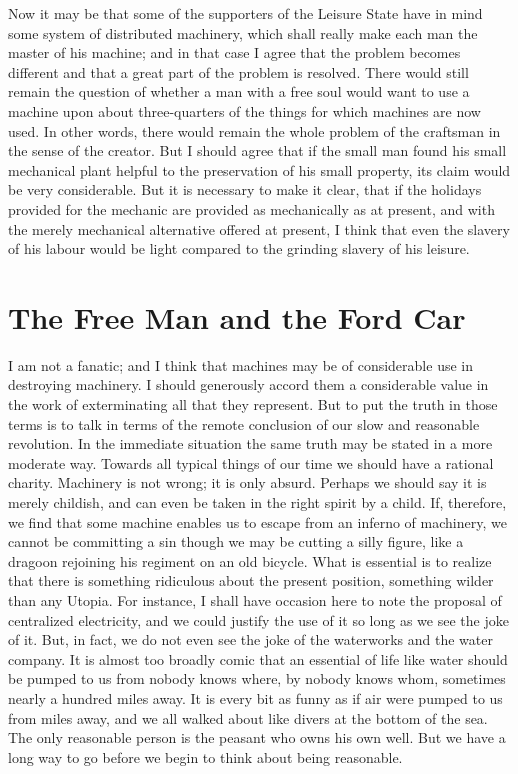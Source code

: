 \documentclass{book}
\begin{document}
Now it may be that some of the supporters of the Leisure State have in mind some system of distributed machinery, which shall really make each man the master of his machine; and in that case I agree that the problem becomes different and that a great part of the problem is resolved. There would still remain the question of whether a man with a free soul would want to use a machine upon about three-quarters of the things for which machines are now used. In other words, there would remain the whole problem of the craftsman in the sense of the creator. But I should agree that if the small man found his small mechanical plant helpful to the preservation of his small property, its claim would be very considerable. But it is necessary to make it clear, that if the holidays provided for the mechanic are provided as mechanically as at present, and with the merely mechanical alternative offered at present, I think that even the slavery of his labour would be light compared to the grinding slavery of his leisure.

\chapter{The Free Man and the Ford Car}
\label{chapter-18}
I am not a fanatic; and I think that machines may be of considerable use in destroying machinery. I should generously accord them a considerable value in the work of exterminating all that they represent. But to put the truth in those terms is to talk in terms of the remote conclusion of our slow and reasonable revolution. In the immediate situation the same truth may be stated in a more moderate way. Towards all typical things of our time we should have a rational charity. Machinery is not wrong; it is only absurd. Perhaps we should say it is merely childish, and can even be taken in the right spirit by a child. If, therefore, we find that some machine enables us to escape from an inferno of machinery, we cannot be committing a sin though we may be cutting a silly figure, like a dragoon rejoining his regiment on an old bicycle. What is essential is to realize that there is something ridiculous about the present position, something wilder than any Utopia. For instance, I shall have occasion here to note the proposal of centralized electricity, and we could justify the use of it so long as we see the joke of it. But, in fact, we do not even see the joke of the waterworks and the water company. It is almost too broadly comic that an essential of life like water should be pumped to us from nobody knows where, by nobody knows whom, sometimes nearly a hundred miles away. It is every bit as funny as if air were pumped to us from miles away, and we all walked about like divers at the bottom of the sea. The only reasonable person is the peasant who owns his own well. But we have a long way to go before we begin to think about being reasonable.
\end{document}
